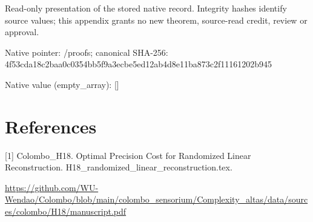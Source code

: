 \documentclass[10pt,a4paper]{article}
\begin{document}
Read-only presentation of the stored native record. Integrity hashes identify source values; this appendix grants no new theorem, source-read credit, review or approval.



Native pointer: /proofs; canonical SHA-256: 4f53cda18c2baa0c0354bb5f\allowbreak{}9a3ecbe5ed12ab4d8e11ba87\allowbreak{}3c2f11161202b945



Native value (empty\_array): []



\section{References}


[1] Colombo\_H18. Optimal Precision Cost for Randomized Linear Reconstruction. H18\_randomized\_linear\_re\allowbreak{}construction.tex.



\url{https://github.com/WU-Wendao/Colombo/blob/main/colombo_sensorium/Complexity_altas/data/sources/colombo/H18/manuscript.pdf}
\end{document}
